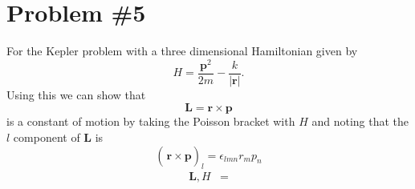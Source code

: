 \documentclass[11pt]{article}
\numberwithin{equation}{section}
\begin{document}
\pagebreak

\section{Problem \#5}
For the Kepler problem with a three dimensional Hamiltonian given by
$$H = \frac{\mathbf{p}^2}{2m} - \frac{k}{|\mathbf{r}|}.$$
Using this we can show that 
$$\mathbf{L} = \mathbf{r}\times\mathbf{p}$$
is a constant of motion by taking the Poisson bracket with $H$ and noting that the $l$ 
component of $\mathbf{L}$ is
$$\left(\frac{}{}\mathbf{r}\times\mathbf{p}\right)_{l} = \epsilon_{lmn}r_mp_n$$
\begin{align*}
{\mathbf{L},H} &= 
\end{align*}
\end{document}
